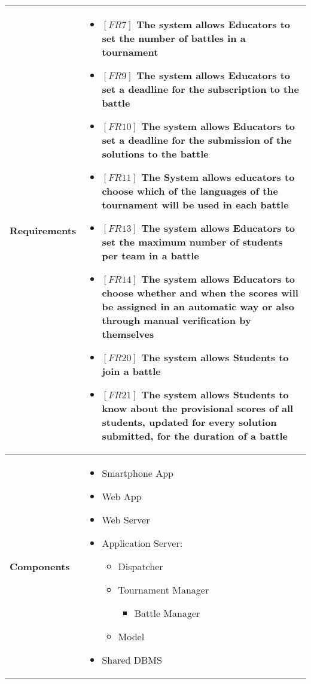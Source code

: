 \documentclass{article}
\begin{document}
\begin{table}[H]
 \renewcommand{\arraystretch}{1.5}
    \centering
    \begin{tabular}{|l|p{10cm}|}
        \hline
        \textbf{Requirements} &
        \vspace{-0.6cm}
        \begin{itemize}[label={}, left=0pt, align=left, itemsep=5pt]
            \item $[FR7]$ The system allows Educators to set the number of battles in a tournament
            \item $[FR9]$ The system allows Educators to set a deadline for the subscription to the battle
            \item $[FR10]$ The system allows Educators to set a deadline for the submission of the solutions to the battle
            \item $[FR11]$ The System allows educators to choose which of the languages of the tournament will be used in each battle
            \item $[FR13]$ The system allows Educators to set the maximum number of students per team in a battle
            \item $[FR14]$ The system allows Educators to choose whether and when the scores will be assigned in an automatic way or also through manual verification by themselves
            \item $[FR20]$ The system allows Students to join a battle
            \item $[FR21]$ The system allows Students to know about the provisional scores of all students, updated for every solution submitted, for the duration of a battle
        \end{itemize} \\
        \hline
        \textbf{Components} & 
        \begin{itemize}[align=left, topsep=0pt, partopsep=0pt]
            \item Smartphone App
            \item Web App
            \item Web Server
            \item Application Server:
            \begin{itemize}
                \item Dispatcher
                \item Tournament Manager
                \begin{itemize}
                    \item Battle Manager
                \end{itemize}
                \item Model
            \end{itemize}
            \item Shared DBMS 
        \end{itemize} \\
        \hline
    \end{tabular}
\end{table}
\end{document}
